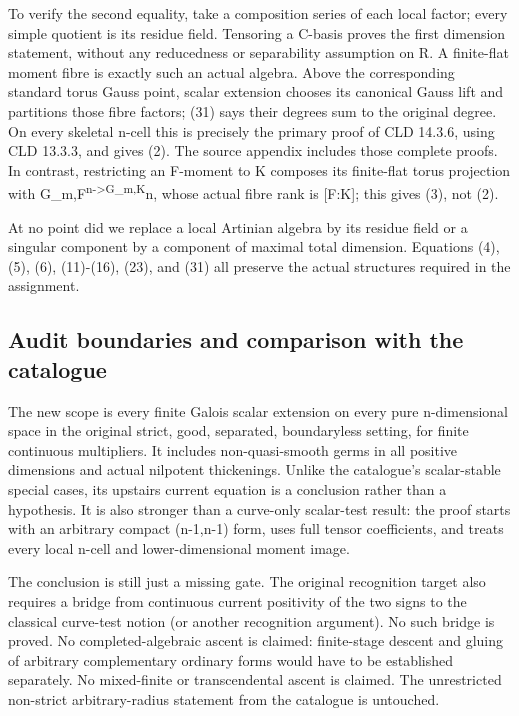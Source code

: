 \documentclass[
  10pt,
]{article}
\begin{document}
To verify the second equality, take a composition series of each local
factor; every simple quotient is its residue field. Tensoring a C-basis
proves the first dimension statement, without any reducedness or
separability assumption on R. A finite-flat moment fibre is exactly such
an actual algebra. Above the corresponding standard torus Gauss point,
scalar extension chooses its canonical Gauss lift and partitions those
fibre factors; (31) says their degrees sum to the original degree. On
every skeletal n-cell this is precisely the primary proof of CLD 14.3.6,
using CLD 13.3.3, and gives (2). The source appendix includes those
complete proofs. In contrast, restricting an F-moment to K composes its
finite-flat torus projection with
G\_m,F\textsuperscript{n-\textgreater G\_m,K}n, whose actual fibre rank
is {[}F:K{]}; this gives (3), not (2).

At no point did we replace a local Artinian algebra by its residue field
or a singular component by a component of maximal total dimension.
Equations (4), (5), (6), (11)-(16), (23), and (31) all preserve the
actual structures required in the assignment.

\subsection{Audit boundaries and comparison with the
catalogue}\label{audit-boundaries-and-comparison-with-the-catalogue}

The new scope is every finite Galois scalar extension on every pure
n-dimensional space in the original strict, good, separated,
boundaryless setting, for finite continuous multipliers. It includes
non-quasi-smooth germs in all positive dimensions and actual nilpotent
thickenings. Unlike the catalogue's scalar-stable special cases, its
upstairs current equation is a conclusion rather than a hypothesis. It
is also stronger than a curve-only scalar-test result: the proof starts
with an arbitrary compact (n-1,n-1) form, uses full tensor coefficients,
and treats every local n-cell and lower-dimensional moment image.

The conclusion is still just a missing gate. The original recognition
target also requires a bridge from continuous current positivity of the
two signs to the classical curve-test notion (or another recognition
argument). No such bridge is proved. No completed-algebraic ascent is
claimed: finite-stage descent and gluing of arbitrary complementary
ordinary forms would have to be established separately. No mixed-finite
or transcendental ascent is claimed. The unrestricted non-strict
arbitrary-radius statement from the catalogue is untouched.
\end{document}
